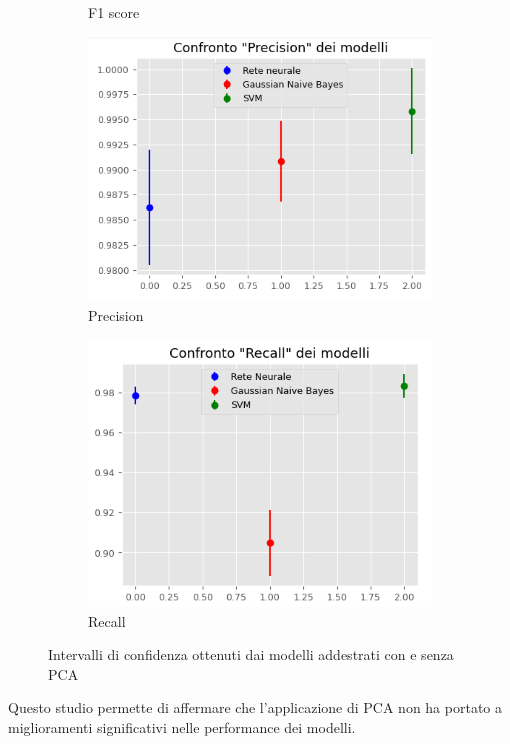 \begin{figure}[!ht]
\begin{subfigure}[b]{0.4\textwidth}
        \caption{F1 score}
        \label{fig:f1_pca}
    \end{subfigure}
    \hfill
    \begin{subfigure}[b]{0.4\textwidth}
        \centering
        \includegraphics[width=\textwidth]{img/ris/precision_inter_pca.png}
        \caption{Precision}
        \label{fig:precision_pca}
    \end{subfigure}
    \hfill
    \begin{subfigure}[b]{0.4\textwidth}
        \centering
        \includegraphics[width=\textwidth]{img/ris/recall_inter_pca.png}
        \caption{Recall}
        \label{fig:recall_pca}
    \end{subfigure}
    \caption{Intervalli di confidenza ottenuti dai modelli addestrati con e senza PCA}
    \label{fig:intervalli_confidenza_pca}
\end{figure}

Questo studio permette di affermare che l'applicazione di PCA non ha portato a
miglioramenti significativi nelle performance dei modelli.